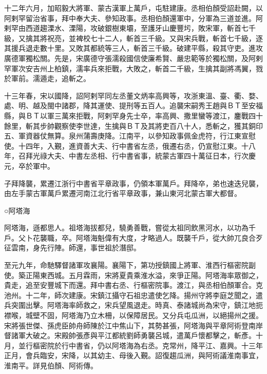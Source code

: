 \begin{pinyinscope}
 十二年六月，加昭毅大將軍、蒙古漢軍上萬戶，屯駐建康。丞相伯顏受詔赴闕，以阿剌罕留治省事，拜中奉大夫、參知政事。丞相伯顏還軍中，分軍為三道並進。阿剌罕由西道趨溧水、溧陽，攻破銀樹東壩，至護牙山慶豐圬，敗宋軍，斬首七千級，又擒其將祝亮，並裨校七十二人，斬首三千級。又與宋兵戰，斬首七千級，逐其援兵退走數十里。又敗其都統等三人，斬首三千級。破建平縣，殺其守吏。進攻廣德軍獨松關。先是，宋廣德守張濡殺國信使廉希賢、嚴忠範等於獨松關，及阿剌罕軍次安吉州上柏鎮，濡率兵來拒戰，大敗之，斬首二千級，生擒其副將馮翼，戮於軍前。濡遁走，追斬之。



 十三年春，宋以國降，詔阿剌罕同左丞董文炳率高興等，攻浙東溫、臺、衢、婺、處、明、越及閩中諸郡，降其運使、提刑等五百人。追襲宋嗣秀王趙與ＢＴ至安福縣，與ＢＴ以軍三萬來拒戰，阿剌罕身先士卒，率高興、撒里蠻等渡江，鏖戰四十餘里，斬其步帥觀察使李世達，生擒與ＢＴ及其將吏百八十人，悉斬之，獲其銅印五、軍資器仗無算。泉州蒲壽庚降。江南平，以參知政事佩金虎符，行江東宣慰使。十四年，入覲，進資善大夫、行中書省左丞，俄遷右丞，仍宣慰江東。十八年，召拜光祿大夫、中書左丞相、行中書省事，統蒙古軍四十萬征日本，行次慶元，卒於軍中。



 子拜降襲，累遷江浙行中書省平章政事，仍領本軍萬戶。拜降卒，弟也速迭兒襲，由左手蒙古軍萬戶累遷河南江北行省平章政事，兼山東河北蒙古軍大都督。



 ○阿塔海



 阿塔海，遜都思人。祖塔海拔都兒，驍勇善戰，嘗從太祖同飲黑河水，以功為千戶。父卜花襲職，卒。阿塔海魁偉有大度，才略過人。既襲千戶，從大帥兀良合歹征雲南，身先行陣。師還，事世祖於潛邸。



 至元九年，命馳驛督諸軍攻襄陽。襄陽下，第功授鎮國上將軍、淮西行樞密院副使。築正陽東西城。五月霖雨，宋將夏貴乘淮水溢，來爭正陽。阿塔海率眾御之，貴走，追至安豐城下而還。拜中書右丞、行樞密院事。渡江，與丞相伯顏軍合。克池州。十二年，師次建康。宋鎮江攝守石祖忠遣使乞降。揚州守將李庭芝聞之，遣兵突圍出擊。阿塔海率師救之，宋兵望風退走。時真、泰諸城尚為宋守，鎮江地扼襟喉，城壁不固，阿塔海乃立木柵，以保障居民。又分兵屯瓜洲，以絕揚州之援。宋將張世傑、孫虎臣帥舟師陳於江中焦山下，其勢甚張，阿塔海與平章阿術登南岸督諸軍大破之。宋殿帥張彥與平江都統劉師勇襲呂城，遣萬戶懷都擊之，斬彥。十月，並行樞密院於行中書省，仍以阿塔海為右丞。克常州，降平江、嘉興。十三年正月，會兵臨安，宋降，以其幼主、母後入覲。詔復趨瓜洲，與阿術議淮南事宜，淮南平。詳見伯顏、阿術傳。




\end{pinyinscope}
